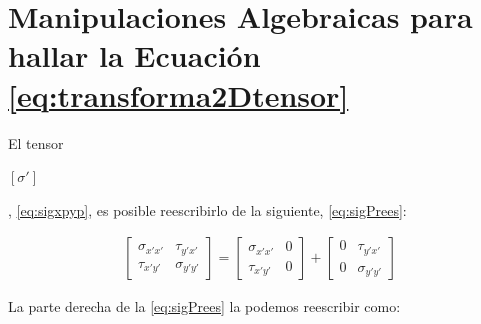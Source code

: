 \documentclass[12pt,letterpaper, twoside, openany]{article}
\begin{document}
\section{Manipulaciones Algebraicas para hallar la Ecuación \ref{eq:transforma2Dtensor}}
%
El tensor \begin{large} $\left[ \sigma' \right]$\end{large}, \cref{eq:sigxpyp}, es posible reescribirlo de la siguiente, \cref{eq:sigPrees}:
%
\begin{large}
	\begin{align}
		\left[ \begin{array}{cc}
		\sigma_{x'x'} & \tau_{y'x'} \\  
		\tau_{x'y'} & \sigma_{y'y'}
		\end{array}  \right]=
		\left[ \begin{array}{cc}
		\sigma_{x'x'} & 0 \\  
		\tau_{x'y'} & 0
		\end{array}  \right] +
		\left[ \begin{array}{cc}
		0 & \tau_{y'x'} \\  
		0 & \sigma_{y'y'}
		\end{array}  \right]
		\label{eq:sigPrees}
	\end{align}
\end{large}
%
La parte derecha de la \cref{eq:sigPrees} la podemos reescribir como:
%
\end{document}
